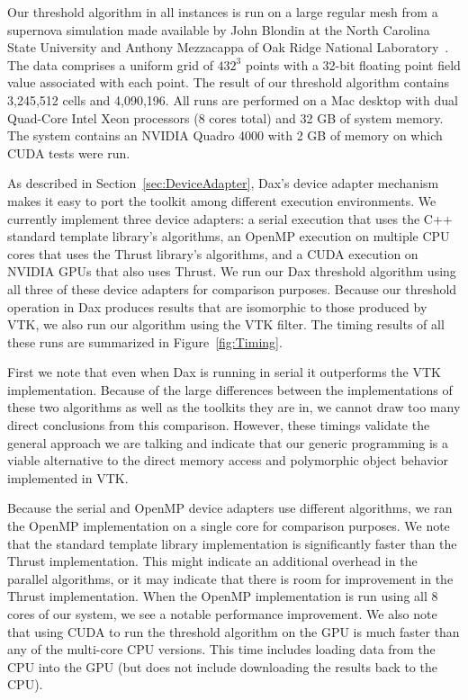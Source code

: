 \documentclass[conference]{IEEEtran}
\newcommand*{\lcite}[1]{~\cite{#1}}
\begin{document}
Our threshold algorithm in all instances is run on a large regular mesh
from a supernova simulation made available by John Blondin at the North
Carolina State University and Anthony Mezzacappa of Oak Ridge National
Laboratory\lcite{Blondin2003}.  The data comprises a uniform grid of
$432^3$ points with a 32-bit floating point field value associated with
each point.  The result of our threshold algorithm contains 3,245,512 cells
and 4,090,196.  All runs are performed on a Mac desktop with dual Quad-Core
Intel Xeon processors (8 cores total) and 32 GB of system memory.  The
system contains an NVIDIA Quadro 4000 with 2 GB of memory on which CUDA
tests were run.

As described in Section~\ref{sec:DeviceAdapter}, Dax's device adapter
mechanism makes it easy to port the toolkit among different execution
environments.  We currently implement three device adapters: a serial
execution that uses the C++ standard template library's algorithms, an
OpenMP execution on multiple CPU cores that uses the Thrust library's
algorithms, and a CUDA execution on NVIDIA GPUs that also uses Thrust.  We
run our Dax threshold algorithm using all three of these device adapters
for comparison purposes.  Because our threshold operation in Dax produces
results that are isomorphic to those produced by VTK, we also run our
algorithm using the VTK filter.  The timing results of all these runs are
summarized in Figure~\ref{fig:Timing}.

First we note that even when Dax is running in serial it outperforms the
VTK implementation.  Because of the large differences between the
implementations of these two algorithms as well as the toolkits they are
in, we cannot draw too many direct conclusions from this comparison.
However, these timings validate the general approach we are talking and
indicate that our generic programming is a viable alternative to the direct
memory access and polymorphic object behavior implemented in VTK.

Because the serial and OpenMP device adapters use different algorithms, we
ran the OpenMP implementation on a single core for comparison purposes.  We
note that the standard template library implementation is significantly
faster than the Thrust implementation.  This might indicate an additional
overhead in the parallel algorithms, or it may indicate that there is room
for improvement in the Thrust implementation.  When the OpenMP
implementation is run using all 8 cores of our system, we see a notable
performance improvement.  We also note that using CUDA to run the threshold
algorithm on the GPU is much faster than any of the multi-core CPU
versions.  This time includes loading data from the CPU into the GPU (but
does not include downloading the results back to the CPU).
\end{document}
